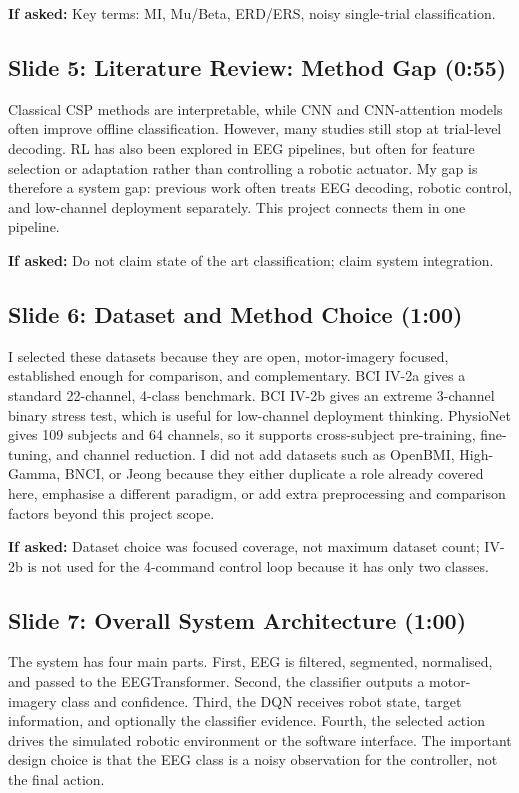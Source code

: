 \documentclass[11pt]{article}
\begin{document}
\textbf{If asked:} Key terms: MI, Mu/Beta, ERD/ERS, noisy single-trial classification.

\subsection*{Slide 5: Literature Review: Method Gap (0:55)}
Classical CSP methods are interpretable, while CNN and CNN-attention models often improve offline classification. However, many studies still stop at trial-level decoding. RL has also been explored in EEG pipelines, but often for feature selection or adaptation rather than controlling a robotic actuator. My gap is therefore a system gap: previous work often treats EEG decoding, robotic control, and low-channel deployment separately. This project connects them in one pipeline.


\textbf{If asked:} Do not claim state of the art classification; claim system integration.

\subsection*{Slide 6: Dataset and Method Choice (1:00)}
I selected these datasets because they are open, motor-imagery focused, established enough for comparison, and complementary. BCI IV-2a gives a standard 22-channel, 4-class benchmark. BCI IV-2b gives an extreme 3-channel binary stress test, which is useful for low-channel deployment thinking. PhysioNet gives 109 subjects and 64 channels, so it supports cross-subject pre-training, fine-tuning, and channel reduction. I did not add datasets such as OpenBMI, High-Gamma, BNCI, or Jeong because they either duplicate a role already covered here, emphasise a different paradigm, or add extra preprocessing and comparison factors beyond this project scope.


\textbf{If asked:} Dataset choice was focused coverage, not maximum dataset count; IV-2b is not used for the 4-command control loop because it has only two classes.

\subsection*{Slide 7: Overall System Architecture (1:00)}
The system has four main parts. First, EEG is filtered, segmented, normalised, and passed to the EEGTransformer. Second, the classifier outputs a motor-imagery class and confidence. Third, the DQN receives robot state, target information, and optionally the classifier evidence. Fourth, the selected action drives the simulated robotic environment or the software interface. The important design choice is that the EEG class is a noisy observation for the controller, not the final action.
\end{document}
